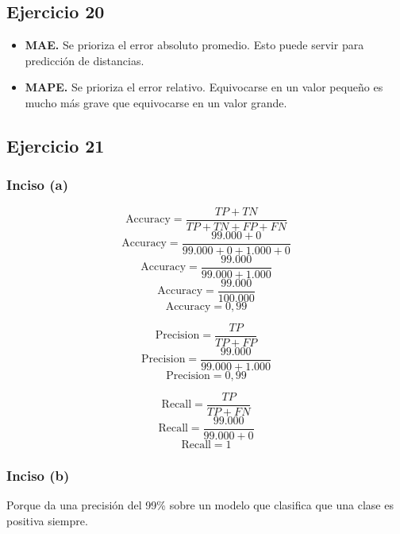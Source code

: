 \documentclass[a4paper,12pt]{article}
\begin{document}
        \subsection*{Ejercicio 20}
            \begin{itemize}
                \item \textbf{MAE.} Se prioriza el error absoluto promedio. Esto puede servir para predicción de distancias.
                \item \textbf{MAPE.} Se prioriza el error relativo. Equivocarse en un valor pequeño es mucho más grave que equivocarse en un valor grande.
            \end{itemize}
        \subsection*{Ejercicio 21}
            \subsubsection*{Inciso (a)}
                \[\text{Accuracy} = \frac{TP+TN}{TP+TN+FP+FN}\]
                \[\text{Accuracy} = \frac{99.000+0}{99.000+0+1.000+0}\]
                \[\text{Accuracy} = \frac{99.000}{99.000+1.000}\]
                \[\text{Accuracy} = \frac{99.000}{100.000}\]
                \[\text{Accuracy} = 0,99\]

                \[\text{Precision} = \frac{TP}{TP+FP}\]
                \[\text{Precision} = \frac{99.000}{99.000+1.000}\]
                \[\text{Precision} = 0,99\]

                \[\text{Recall} = \frac{TP}{TP+FN}\]
                \[\text{Recall} = \frac{99.000}{99.000+0}\]
                \[\text{Recall} = 1\]
            \subsubsection*{Inciso (b)}
                \noindent Porque da una precisión del 99\% sobre un modelo que clasifica que una clase es positiva siempre.
\end{document}

